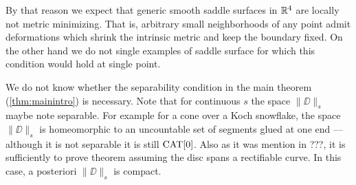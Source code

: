 \documentclass{article}
\begin{document}
By that reason we expect that generic smooth saddle surfaces in $\mathbb{R}^4$ are locally not metric minimizing. 
That is, arbitrary small neighborhoods of any point admit deformations which shrink 
the intrinsic metric and keep the boundary fixed.
On the other hand we do not single examples of saddle surface for which this condition would hold at single point.

We do not know whether the separability condition in the main theorem (\ref{thm:mainintro}) is necessary.
Note that for continuous $s$ the space $\|\DD\|_s$ maybe note separable.
For example for a cone over a Koch snowflake, the space $\|\DD\|_s$ is homeomorphic to an uncountable set of segments glued at one end --- although it is not separable it is still $\mathop{\rm CAT}\nolimits[0]$.
Also as it was mention in ???, 
it is sufficiently to prove theorem assuming the disc spans a rectifiable curve.
In this case, a posteriori $\|\DD\|_s$ is compact.
\end{document}
